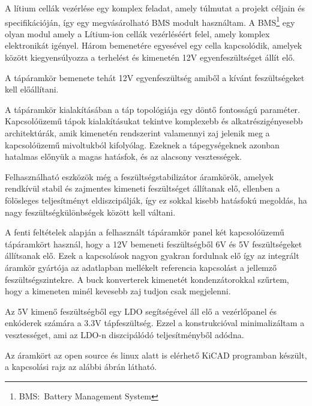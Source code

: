 \medskip

A lítium cellák vezérlése egy komplex feladat, amely túlmutat a projekt céljain
és specifikációján, így egy megvásárolható BMS modult használtam. A
BMS\footnote{BMS:~Battery Management System} egy olyan modul amely a Lítium-ion
cellák vezérléséért felel, amely komplex elektronikát igényel. Három bemenetére
egyesével egy cella kapcsolódik, amelyek között kiegyensúlyozza a terhelést és
kimenetén 12V egyenfeszültséget állít elő.

A tápáramkör bemenete tehát 12V egyenfeszültség amiből a kívánt feszültségeket
kell előállítani. 


A tápáramkör kialakításában a táp topológiája egy döntő fontosságú paraméter.
Kapcsolóüzemű tápok kialakításukat tekintve komplexebb és alkatrészigényesebb
architektúrák, amik kimenetén rendszerint valamennyi zaj jelenik meg a
kapcsolóüzemű mivoltukból kifolyólag. Ezeknek a tápegységeknek azonban hatalmas
előnyük a magas hatásfok, és az alacsony vesztességek.

Felhasználható eszközök még a feszültségstabilizátor áramkörök, amelyek rendkívül
stabil és zajmentes kimeneti feszültséget állítanak elő, ellenben a fölösleges
teljesítményt eldiszcipálják, így ez sokkal kisebb hatásfokú megoldás, ha nagy
feszültségkülönbségek között kell váltani.

A fenti feltételek alapján a felhasznált tápáramkör panel két kapcsolóüzemű
tápáramkört használ, hogy a 12V bemeneti feszültségből 6V és 5V feszültségeket
állítsanak elő. Ezek a kapcsolások nagyon gyakran fordulnak elő így az integrált
áramkör gyártója az adatlapban mellékelt referencia kapcsolást a jellemző
feszültségszintekre. A buck konverterek kimenetét kondenzátorokkal szűrtem, hogy
a kimeneten minél kevesebb zaj tudjon csak megjelenni.

Az 5V kimenő feszültségből egy LDO segítségével áll elő a vezérlőpanel és
enkóderek számára a 3.3V tápfeszültség. Ezzel a konstrukcióval minimalizáltam
a vesztességet, ami az LDO-n diszcipálódó teljesítményből adódna. 

Az áramkört az open source és linux alatt is elérhető KiCAD programban
készült, a kapcsolási rajz az alábbi ábrán látható.

